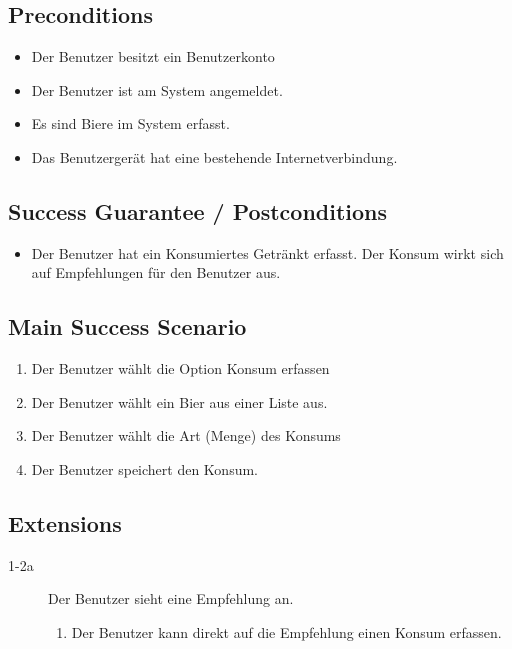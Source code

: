\documentclass[10pt,a4paper]{scrartcl}
\begin{document}
\subsection*{Preconditions}

\begin{itemize}
\item Der Benutzer besitzt ein Benutzerkonto
\item Der Benutzer ist am System angemeldet.
\item Es sind Biere im System erfasst.
\item Das Benutzergerät hat eine bestehende Internetverbindung.
\end{itemize}


\subsection*{Success Guarantee / Postconditions}
\begin{itemize}
\item Der Benutzer hat ein Konsumiertes Getränkt erfasst. Der Konsum wirkt sich auf Empfehlungen für den Benutzer aus.
\end{itemize}


\subsection*{Main Success Scenario}

\begin{enumerate}
\item Der Benutzer wählt die Option Konsum erfassen
\item Der Benutzer wählt ein Bier aus einer Liste aus.
\item Der Benutzer wählt die Art (Menge) des Konsums
\item Der Benutzer speichert den Konsum.
\end{enumerate}


\subsection*{Extensions}

\begin{description}
\item[1-2a] Der Benutzer sieht eine Empfehlung an.
	\begin{enumerate}
	\item Der Benutzer kann direkt auf die Empfehlung einen Konsum erfassen.
	\end{enumerate}

\end{description}
\end{document}
